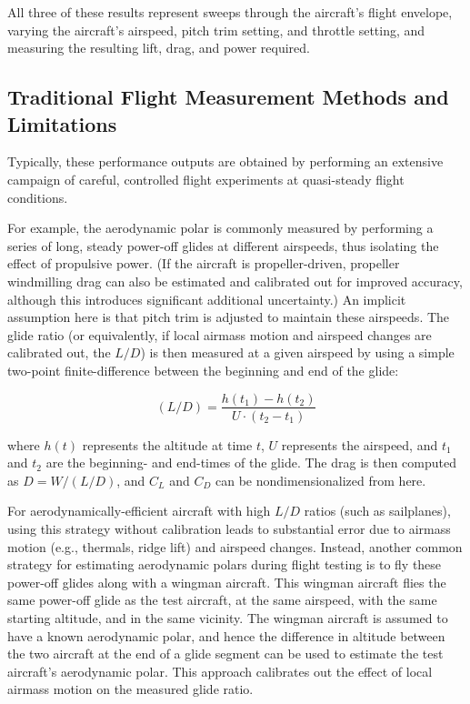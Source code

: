 All three of these results represent sweeps through the aircraft's flight envelope, varying the aircraft's airspeed, pitch trim setting, and throttle setting, and measuring the resulting lift, drag, and power required.

\subsection{Traditional Flight Measurement Methods and Limitations}

Typically, these performance outputs are obtained by performing an extensive campaign of careful, controlled flight experiments at quasi-steady flight conditions.

For example, the aerodynamic polar is commonly measured by performing a series of long, steady power-off glides at different airspeeds, thus isolating the effect of propulsive power. (If the aircraft is propeller-driven, propeller windmilling drag can also be estimated and calibrated out for improved accuracy, although this introduces significant additional uncertainty.) An implicit assumption here is that pitch trim is adjusted to maintain these airspeeds. The glide ratio (or equivalently, if local airmass motion and airspeed changes are calibrated out, the $L/D$) is then measured at a given airspeed by using a simple two-point finite-difference between the beginning and end of the glide:

$$(L/D) = \frac{h(t_1) - h(t_2)}{U \cdot (t_2 - t_1)}$$

where $h(t)$ represents the altitude at time $t$, $U$ represents the airspeed, and $t_1$ and $t_2$ are the beginning- and end-times of the glide. The drag is then computed as $D = W / (L/D)$, and $C_L$ and $C_D$ can be nondimensionalized from here.

For aerodynamically-efficient aircraft with high $L/D$ ratios (such as sailplanes), using this strategy without calibration leads to substantial error due to airmass motion (e.g., thermals, ridge lift) and airspeed changes. Instead, another common strategy for estimating aerodynamic polars during flight testing is to fly these power-off glides along with a wingman aircraft. This wingman aircraft flies the same power-off glide as the test aircraft, at the same airspeed, with the same starting altitude, and in the same vicinity. The wingman aircraft is assumed to have a known aerodynamic polar, and hence the difference in altitude between the two aircraft at the end of a glide segment can be used to estimate the test aircraft's aerodynamic polar. This approach calibrates out the effect of local airmass motion on the measured glide ratio.

